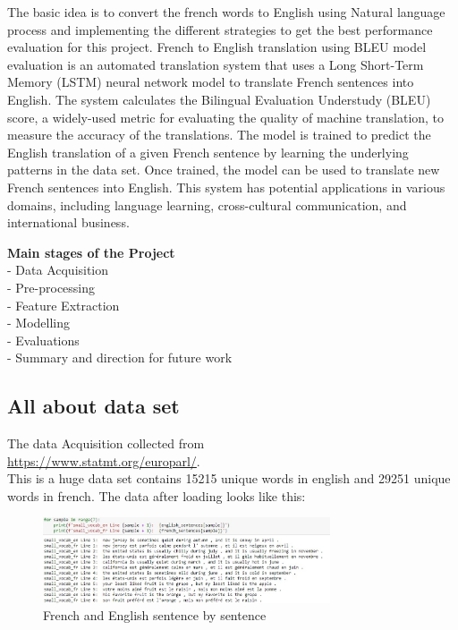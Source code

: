 \documentclass{article}
\begin{document}
The basic idea is to convert the french words to English using Natural language process and implementing the different strategies to get the best performance evaluation for this project. French to English translation using BLEU model evaluation is an automated translation system that uses a Long Short-Term Memory (LSTM) neural network model to translate French sentences into English. The system calculates the Bilingual Evaluation Understudy (BLEU) score, a widely-used metric for evaluating the quality of machine translation, to measure the accuracy of the translations. The model is trained to predict the English translation of a given French sentence by learning the underlying patterns in the data set. Once trained, the model can be used to translate new French sentences into English. This system has potential applications in various domains, including language learning, cross-cultural communication, and international business.

\textbf{Main stages of the Project} \\
- Data Acquisition \\ 
- Pre-processing \\ 
- Feature Extraction \\
- Modelling \\
- Evaluations \\
- Summary and direction for future work \\

\subsection{All about data set }

The data Acquisition collected from \\
\url{https://www.statmt.org/europarl/}. \\
This is a huge data set contains 15215 unique words in english and 29251 unique words in french. The data after loading looks like this: 

\begin{figure}[htp]
    \centering
    \includegraphics[width=8.5cm]{1.jpg}
    \caption{French and English sentence by sentence}
    \label{fig:galaxy}
\end{figure}
\end{document}
